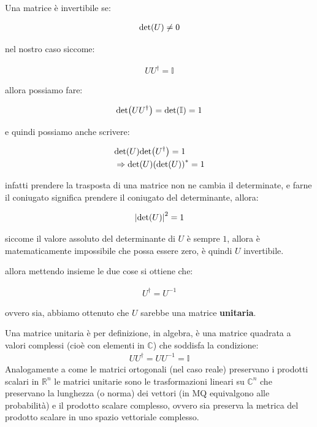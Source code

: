 \begin{myapprf}
	Una matrice è invertibile se:
	
\begin{align*}
	\text{det}\qty(U) \neq 0
\end{align*}

	nel nostro caso siccome:
	
\begin{align*}
	U U^{\dagger} = \mathbb{I}
\end{align*}

	allora possiamo fare:
	
\begin{align*}
	\text{det}\qty(U U^{\dagger}) = \text{det}\qty(\mathbb{I}) = 1
\end{align*}

	e quindi possiamo anche scrivere:

\begin{align*}
	& \text{det}\qty(U) \text{det}\qty(U^{\dagger}) = 1 \\
	& \Rightarrow  \text{det}\qty(U) \qty(\text{det}\qty(U))^* = 1
\end{align*}

	infatti prendere la trasposta di una matrice non ne cambia il determinate, e farne il coniugato significa prendere il coniugato del determinante, allora:
	
\begin{align*}
	\qty|\text{det}\qty(U)|^2 = 1
\end{align*}

	siccome il valore assoluto del determinante di $U$ è sempre $1$, allora è matematicamente impossibile che possa essere zero, è quindi $U$ invertibile.
	
\end{myapprf}

	allora mettendo insieme le due cose si ottiene che:
	
\begin{align*}
	U^{\dagger} = U^{-1} 
\end{align*}

	ovvero sia, abbiamo ottenuto  che $U$ sarebbe una matrice \textbf{unitaria}. 

\begin{myapprf}
	Una matrice unitaria è per definizione, in algebra, è una matrice quadrata a valori complessi (cioè con elementi in $\mathbb{C}$) che soddisfa la condizione:
\begin{align*}
	UU^{\dagger} = UU^{-1} = \mathbb{I}
\end{align*}
	Analogamente a come le matrici ortogonali (nel caso reale) preservano i prodotti scalari in $\mathbb{R}^{n}$ le matrici unitarie sono le trasformazioni lineari su $\mathbb{C}^n$ che preservano la lunghezza (o norma) dei vettori (in MQ equivalgono alle probabilità) e il prodotto scalare complesso, ovvero sia preserva la metrica del prodotto scalare in uno spazio vettoriale complesso.
\end{myapprf}
	
